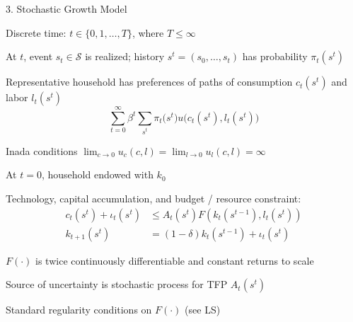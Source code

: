 \documentclass[11pt, aspectratio=169]{beamer}
\newenvironment{witemize}{\itemize\addtolength{\itemsep}{10pt}}{\enditemize}
\begin{document}
\begin{frame}{3. Stochastic Growth Model}
\begin{witemize}
\item Discrete time: $t \in \{0, 1, \ldots, T\}$, where $T \leq \infty$

\item At $t$, event $s_t \in \mathcal{S}$ is realized; history $s^t = (s_0, \ldots, s_t)$ has probability $\pi_t(s^t)$

\item Representative household has preferences of paths of consumption $c_t(s^t)$ and labor $l_t(s^t)$ 
\begin{equation*}
	\sum_{t=0}^\infty \beta^t \sum_{s^t} \pi_t\Big(s^t \Big) u \Big( c_t(s^t), l_t(s^t) \Big)
\end{equation*}

\item Inada conditions $\lim_{c\to 0} u_c(c, l) = \lim_{l\to0} u_l (c, l) = \infty$

\item At $t=0$, household endowed with $k_0$
\end{witemize}
\end{frame}


\begin{frame}{}
\begin{witemize}
\item Technology, capital accumulation, and budget / resource constraint:
\begin{align*}
	c_t(s^t) + \iota_t(s^t) &\leq A_t(s^t) F(k_t(s^{t-1}), l_t(s^t)) \\
	k_{t+1}(s^t) &= (1-\delta) k_t(s^{t-1}) + \iota_t(s^t)
\end{align*}

\item $F(\cdot)$ is twice continuously differentiable and constant returns to scale

\item Source of uncertainty is stochastic process for TFP $A_t(s^t)$

\item Standard regularity conditions on $F(\cdot)$ (see LS)
\end{witemize}
\end{frame}
\end{document}
